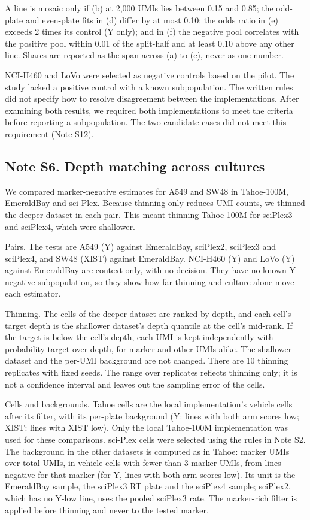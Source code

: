 \documentclass[
  11pt,
  letterpaper,
]{article}
\begin{document}
A line is mosaic only if (b) at 2,000 UMIs lies between 0.15 and 0.85;
the odd-plate and even-plate fits in (d) differ by at most 0.10; the
odds ratio in (e) exceeds 2 times its control (Y only); and in (f) the
negative pool correlates with the positive pool within 0.01 of the
split-half and at least 0.10 above any other line. Shares are reported
as the span across (a) to (c), never as one number.

NCI-H460 and LoVo were selected as negative controls based on the pilot.
The study lacked a positive control with a known subpopulation. The
written rules did not specify how to resolve disagreement between the
implementations. After examining both results, we required both
implementations to meet the criteria before reporting a subpopulation.
The two candidate cases did not meet this requirement (Note S12).

\subsection{Note S6. Depth matching across
cultures}\label{note-s6.-depth-matching-across-cultures}

We compared marker-negative estimates for A549 and SW48 in Tahoe-100M,
EmeraldBay and sci-Plex. Because thinning only reduces UMI counts, we
thinned the deeper dataset in each pair. This meant thinning Tahoe-100M
for sciPlex3 and sciPlex4, which were shallower.

Pairs. The tests are A549 (Y) against EmeraldBay, sciPlex2, sciPlex3 and
sciPlex4, and SW48 (XIST) against EmeraldBay. NCI-H460 (Y) and LoVo (Y)
against EmeraldBay are context only, with no decision. They have no
known Y-negative subpopulation, so they show how far thinning and
culture alone move each estimator.

Thinning. The cells of the deeper dataset are ranked by depth, and each
cell's target depth is the shallower dataset's depth quantile at the
cell's mid-rank. If the target is below the cell's depth, each UMI is
kept independently with probability target over depth, for marker and
other UMIs alike. The shallower dataset and the per-UMI background are
not changed. There are 10 thinning replicates with fixed seeds. The
range over replicates reflects thinning only; it is not a confidence
interval and leaves out the sampling error of the cells.

Cells and backgrounds. Tahoe cells are the local implementation's
vehicle cells after its filter, with its per-plate background (Y: lines
with both arm scores low; XIST: lines with XIST low). Only the local
Tahoe-100M implementation was used for these comparisons. sci-Plex cells
were selected using the rules in Note S2. The background in the other
datasets is computed as in Tahoe: marker UMIs over total UMIs, in
vehicle cells with fewer than 3 marker UMIs, from lines negative for
that marker (for Y, lines with both arm scores low). Its unit is the
EmeraldBay sample, the sciPlex3 RT plate and the sciPlex4 sample;
sciPlex2, which has no Y-low line, uses the pooled sciPlex3 rate. The
marker-rich filter is applied before thinning and never to the tested
marker.
\end{document}
